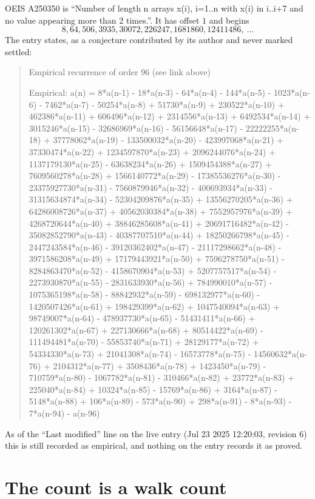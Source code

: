 \documentclass[11pt,a4paper]{article}
\theoremstyle{plain}
\theoremstyle{definition}
\begin{document}
OEIS A250350 is ``Number of length n arrays x(i), i=1..n with x(i) in i..i+7 and no value appearing more than 2 times.''. It has offset $1$ and begins
\[
8, 64, 506, 3935, 30072, 226247, 1681860, 12411486,\ \dots
\]
The entry states, as a conjecture contributed by its author and never marked settled:
\begin{quote}\raggedright\small
Empirical recurrence of order 96 (see link above)

Empirical: a(n) = 8*a(n-1) - 18*a(n-3) - 64*a(n-4) - 144*a(n-5) - 1023*a(n-6) - 7462*a(n-7) - 50254*a(n-8) + 51730*a(n-9) + 230522*a(n-10) + 462386*a(n-11) + 606496*a(n-12) + 2314556*a(n-13) + 6492534*a(n-14) + 3015246*a(n-15) - 32686969*a(n-16) - 56156648*a(n-17) - 22222255*a(n-18) + 37778062*a(n-19) - 133500032*a(n-20) - 423997068*a(n-21) + 37330474*a(n-22) + 1234597870*a(n-23) + 2096244076*a(n-24) + 1137179130*a(n-25) - 63638234*a(n-26) + 1509454388*a(n-27) + 7609560278*a(n-28) + 1566140772*a(n-29) - 17385536276*a(n-30) - 23375927730*a(n-31) - 7560879946*a(n-32) - 400693934*a(n-33) - 31315634874*a(n-34) - 52304209876*a(n-35) + 13556270205*a(n-36) + 64286008726*a(n-37) + 40562030384*a(n-38) + 7552957976*a(n-39) + 4268720644*a(n-40) + 38846285608*a(n-41) + 20691716482*a(n-42) - 35082852790*a(n-43) - 40387707510*a(n-44) + 18250266798*a(n-45) - 2447243584*a(n-46) - 39120362402*a(n-47) - 21117298662*a(n-48) - 3971586208*a(n-49) + 17179443921*a(n-50) + 7596278750*a(n-51) - 8284863470*a(n-52) - 4158670904*a(n-53) + 5207757517*a(n-54) - 2273930870*a(n-55) - 2831633930*a(n-56) + 784990010*a(n-57) - 1075365198*a(n-58) - 88842932*a(n-59) - 698132977*a(n-60) - 1420507426*a(n-61) + 198429399*a(n-62) + 1047540094*a(n-63) + 98749007*a(n-64) - 478937730*a(n-65) - 51431411*a(n-66) + 120261302*a(n-67) + 227130666*a(n-68) + 80514422*a(n-69) - 111494481*a(n-70) - 55853740*a(n-71) + 28129177*a(n-72) + 54334330*a(n-73) + 21041308*a(n-74) - 16573778*a(n-75) - 14560632*a(n-76) + 2104312*a(n-77) + 3508436*a(n-78) + 1423450*a(n-79) - 710759*a(n-80) - 1067782*a(n-81) - 310466*a(n-82) + 23772*a(n-83) + 225040*a(n-84) + 10324*a(n-85) - 15769*a(n-86) + 3164*a(n-87) - 5148*a(n-88) + 106*a(n-89) - 573*a(n-90) + 298*a(n-91) - 8*a(n-93) - 7*a(n-94) - a(n-96)
\end{quote}
As of the ``Last modified'' line on the live entry (Jul 23 2025 12:20:03, revision 6) this is still
recorded as empirical, and nothing on the entry records it as proved.

\section{The count is a walk count}
\end{document}
